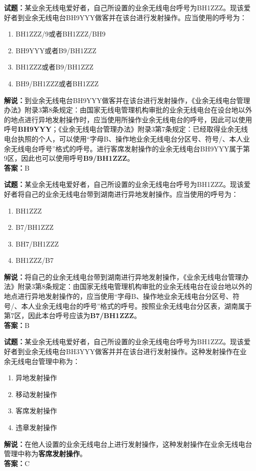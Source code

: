 \documentclass{ctexbook}
\begin{document}
\bigskip


\noindent\textbf{试题：}某业余无线电爱好者，自己所设置的业余无线电台呼号为BH1ZZZ。现该爱好者到业余无线电台BH9YYY做客并在该台进行发射操作。应当使用的呼号为：
\begin{enumerate}[leftmargin=3em]
\item BH1ZZZ/9或者BH1ZZZ/BH9
\item BH9YYY或者B9/BH1ZZZ
\item BH1ZZZ或者B9/BH1ZZZ
\item BH9/BH1ZZZ或者BH1ZZZ
\end{enumerate}
\noindent\textbf{解说：}到业余无线电台BH9YYY做客并在该台进行发射操作，《业余无线电台管理办法》附录3第8条规定：由国家无线电管理机构审批的业余无线电台在设台地以外的地点进行异地发射操作时，应当使用所操作业余无线电台的呼号，因此可以使用呼号\textbf{BH9YYY}；《业余无线电台管理办法》附录3第7条规定：已经取得业余无线电台执照的个人，可以使用“字母B、操作地业余无线电台分区号、符号/、本人业余无线电台呼号”格式的呼号。进行客席发射操作的业余无线电台BH9YYY属于第9区，因此也可以使用呼号\textbf{B9/BH1ZZZ}。\\\noindent\textbf{答案：}B



\bigskip


\noindent\textbf{试题：}某业余无线电爱好者，自己所设置的业余无线电台呼号为BH1ZZZ。现该爱好者将自己的业余无线电台带到湖南进行异地发射操作。应当使用的呼号为：
\begin{enumerate}[leftmargin=3em]
\item BH1ZZZ
\item B7/BH1ZZZ
\item BH7/BH1ZZZ
\item BH1ZZZ/B7
\end{enumerate}
\noindent\textbf{解说：}将自己的业余无线电台带到湖南进行异地发射操作，《业余无线电台管理办法》附录3第8条规定：由国家无线电管理机构审批的业余无线电台在设台地以外的地点进行异地发射操作的，应当使用“字母B、操作地业余无线电台分区号、符号/、本人业余无线电台的呼号”格式的呼号。按照业余无线电台分区表，湖南属于第7区，因此本台呼号应该为\textbf{B7/BH1ZZZ}。\\\noindent\textbf{答案：}B



\bigskip


\noindent\textbf{试题：}某业余无线电爱好者，自己所设置的业余无线电台呼号为BH1ZZZ。现该爱好者到业余无线电台BH3YYY做客并并在该台进行发射操作。这种发射操作在业余无线电台管理中称为：
\begin{enumerate}[leftmargin=3em]
\item 异地发射操作
\item 移动发射操作
\item 客席发射操作
\item 违章发射操作
\end{enumerate}
\noindent\textbf{解说：}在他人设置的业余无线电台上进行发射操作，这种发射操作在业余无线电台管理中称为\textbf{客席发射操作}。\\\noindent\textbf{答案：}C
\end{document}
